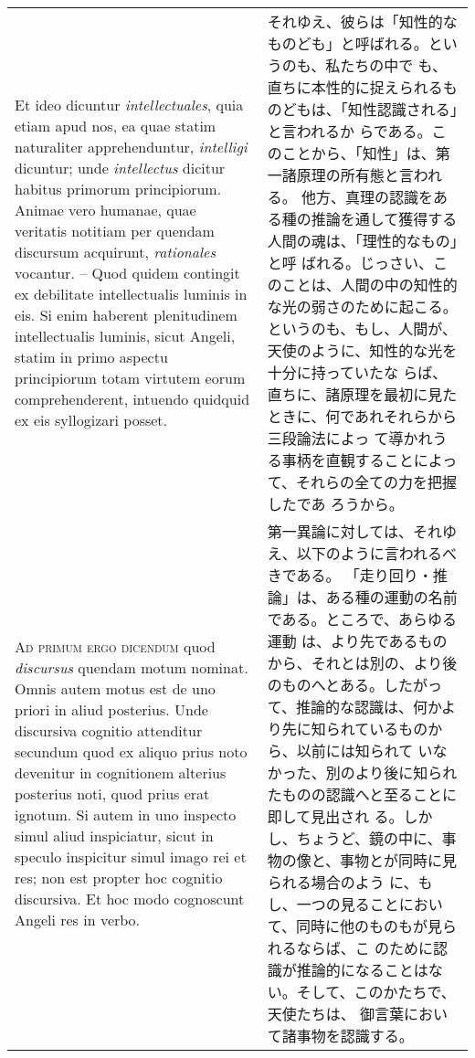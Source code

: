 \documentclass[10pt]{jsarticle} %
\begin{document}
\begin{longtable}{p{21em}p{21em}}
\\

Et ideo dicuntur {\itshape intellectuales}, quia etiam apud
 nos, ea quae statim naturaliter apprehenduntur, {\itshape intelligi} dicuntur;
 unde {\itshape intellectus} dicitur habitus primorum principiorum. Animae vero
 humanae, quae veritatis notitiam per quendam discursum acquirunt,
 {\itshape rationales} vocantur. -- Quod quidem contingit ex debilitate intellectualis
 luminis in eis. Si enim haberent plenitudinem intellectualis luminis,
 sicut Angeli, statim in primo aspectu principiorum totam virtutem eorum
 comprehenderent, intuendo quidquid ex eis syllogizari posset.


&

それゆえ、彼らは「知性的なものども」と呼ばれる。というのも、私たちの中で
 も、直ちに本性的に捉えられるものどもは、「知性認識される」と言われるか
 らである。このことから、「知性」は、第一諸原理の所有態と言われる。
他方、真理の認識をある種の推論を通して獲得する人間の魂は、「理性的なもの」と呼
 ばれる。じっさい、このことは、人間の中の知性的な光の弱さのために起こる。
 というのも、もし、人間が、天使のように、知性的な光を十分に持っていたな
 らば、直ちに、諸原理を最初に見たときに、何であれそれらから三段論法によっ
 て導かれうる事柄を直観することによって、それらの全ての力を把握したであ
 ろうから。


\\



{\scshape Ad primum ergo dicendum} quod {\itshape discursus}
 quendam motum nominat. Omnis autem motus est de uno priori in aliud
 posterius. Unde discursiva cognitio attenditur secundum quod ex aliquo
 prius noto devenitur in cognitionem alterius posterius noti, quod prius
 erat ignotum. Si autem in uno inspecto simul aliud inspiciatur, sicut
 in speculo inspicitur simul imago rei et res; non est propter hoc
 cognitio discursiva. Et hoc modo cognoscunt Angeli res in verbo.


&

 第一異論に対しては、それゆえ、以下のように言われるべきである。
 「走り回り・推論」は、ある種の運動の名前である。ところで、あらゆる運動
 は、より先であるものから、それとは別の、より後のものへとある。したがっ
 て、推論的な認識は、何かより先に知られているものから、以前には知られて
 いなかった、別のより後に知られたものの認識へと至ることに即して見出され
 る。しかし、ちょうど、鏡の中に、事物の像と、事物とが同時に見られる場合のよう
 に、もし、一つの見ることにおいて、同時に他のものもが見られるならば、こ
 のために認識が推論的になることはない。そして、このかたちで、天使たちは、
 御言葉において諸事物を認識する。
 

\end{longtable}
\end{document}
